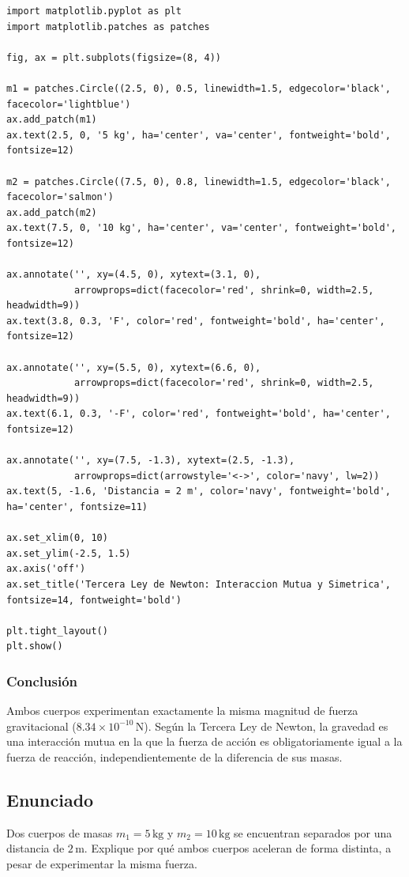 \documentclass[12pt]{article}
\begin{document}
\begin{lstlisting}
import matplotlib.pyplot as plt
import matplotlib.patches as patches

fig, ax = plt.subplots(figsize=(8, 4))

m1 = patches.Circle((2.5, 0), 0.5, linewidth=1.5, edgecolor='black', facecolor='lightblue')
ax.add_patch(m1)
ax.text(2.5, 0, '5 kg', ha='center', va='center', fontweight='bold', fontsize=12)

m2 = patches.Circle((7.5, 0), 0.8, linewidth=1.5, edgecolor='black', facecolor='salmon')
ax.add_patch(m2)
ax.text(7.5, 0, '10 kg', ha='center', va='center', fontweight='bold', fontsize=12)

ax.annotate('', xy=(4.5, 0), xytext=(3.1, 0), 
            arrowprops=dict(facecolor='red', shrink=0, width=2.5, headwidth=9))
ax.text(3.8, 0.3, 'F', color='red', fontweight='bold', ha='center', fontsize=12)

ax.annotate('', xy=(5.5, 0), xytext=(6.6, 0), 
            arrowprops=dict(facecolor='red', shrink=0, width=2.5, headwidth=9))
ax.text(6.1, 0.3, '-F', color='red', fontweight='bold', ha='center', fontsize=12)

ax.annotate('', xy=(7.5, -1.3), xytext=(2.5, -1.3), 
            arrowprops=dict(arrowstyle='<->', color='navy', lw=2))
ax.text(5, -1.6, 'Distancia = 2 m', color='navy', fontweight='bold', ha='center', fontsize=11)

ax.set_xlim(0, 10)
ax.set_ylim(-2.5, 1.5)
ax.axis('off')
ax.set_title('Tercera Ley de Newton: Interaccion Mutua y Simetrica', fontsize=14, fontweight='bold')

plt.tight_layout()
plt.show()
\end{lstlisting}

\subsubsection*{Conclusión}
Ambos cuerpos experimentan exactamente la misma magnitud de fuerza gravitacional ($8.34 \times 10^{-10} \, \text{N}$). Según la Tercera Ley de Newton, la gravedad es una interacción mutua en la que la fuerza de acción es obligatoriamente igual a la fuerza de reacción, independientemente de la diferencia de sus masas.

\newpage

\subsection*{Enunciado}
Dos cuerpos de masas $m_1 = 5 \, \text{kg}$ y $m_2 = 10 \, \text{kg}$ se encuentran separados por una distancia de $2 \, \text{m}$. Explique por qué ambos cuerpos aceleran de forma distinta, a pesar de experimentar la misma fuerza.
\end{document}
